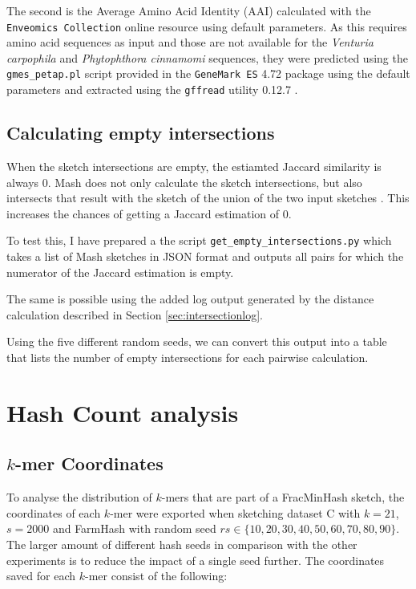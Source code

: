The second is the Average Amino Acid Identity (AAI)
\cite{konstantinidisGenomeBasedTaxonomyProkaryotes2005} calculated with the
\texttt{Enveomics Collection} online resource
\cite{rodriguez-rEnveomicsCollectionToolbox2016} using default parameters. As
this requires amino acid sequences as input and those are not available for the
\textit{Venturia carpophila} and \textit{Phytophthora cinnamomi} sequences, they
were predicted using the \texttt{gmes\_petap.pl} script provided in the
\texttt{GeneMark ES} 4.72 package \cite{lomsadzeGeneIdentificationNovel2005}
using the default parameters and extracted using the \texttt{gffread} utility
0.12.7 \cite{perteaGFFUtilitiesGffRead2020}.


\subsection*{Calculating empty intersections}
When the sketch intersections are empty, the estiamted Jaccard similarity is
always 0. Mash does not only calculate the sketch intersections, but also
intersects that result with the sketch of the union of the two input sketches
\cite{ondovMashFastGenome2016}. This increases the chances of getting a Jaccard
estimation of 0. 

To test this, I have prepared a the script \texttt{get\_empty\_intersections.py}
which takes a list of Mash sketches in JSON format and outputs all pairs for
which the numerator of the Jaccard estimation is empty.

The same is possible using the added log output generated by the distance
calculation described in Section \ref{sec:intersectionlog}.

Using the five different random seeds, we can convert this output into a table
that lists the number of empty intersections for each pairwise calculation.



\section{Hash Count analysis}
\subsection*{$k$-mer Coordinates}
To analyse the distribution of $k$-mers that are part of a FracMinHash sketch,
the coordinates of each $k$-mer were exported when sketching dataset C with
$k=21$, $s=2000$ and FarmHash with random seed $rs \in \{10, 20, 30, 40, 50, 60,
70, 80, 90\}$. The larger amount of different hash seeds in comparison with the
other experiments is to reduce the impact of a single seed further. 
The coordinates saved for each $k$-mer consist of the following:

